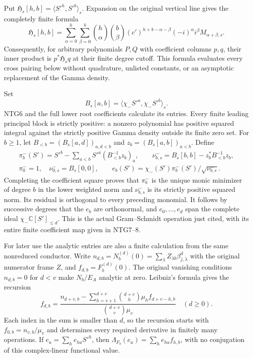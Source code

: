 Put $\mathfrak H_s[h,b]=\langle S'^h,S'^b\rangle_s$. Expansion
on the original vertical line gives the completely finite formula
\[
 \mathfrak H_s[h,b]
 =\sum_{\alpha=0}^{h}\sum_{\beta=0}^{b}
 \binom h\alpha\binom b\beta
 (c')^{h+b-\alpha-\beta}(-i)^\alpha i^\beta
 M_{\alpha+\beta,s}.
                                                               \tag{NTG6}
\]
Consequently, for arbitrary polynomials $P,Q$ with coefficient
columns $p,q$, their inner product is $p^*\mathfrak H_s q$
at their finite degree cutoff. This formula evaluates every
cross pairing below without quadrature, unlisted constants, or
an asymptotic replacement of the Gamma density.

Set
\[
 B_s[a,b]=\langle\chi_-S'^a,\chi_-S'^b\rangle_s.
                                                               \tag{NTG7}
\]
NTG6 and the full lower root coefficients calculate its entries.
Every finite leading principal block is strictly positive:
a nonzero polynomial has positive squared integral against the
strictly positive Gamma density outside its finite zero set.
For $b\ge1$, let $B_{<b}=(B_s[a,d])_{a,d<b}$ and
$z_b=(B_s[a,b])_{a<b}$. Define
\[
\begin{gathered}
 \pi_b^-(S')=S'^b-\sum_{a<b}S'^a(B_{<b}^{-1}z_b)_a,\qquad
 \nu_{b,s}^-=B_s[b,b]-z_b^*B_{<b}^{-1}z_b,\\
 \pi_0^-=1,\quad\nu_{0,s}^-=B_s[0,0],\qquad
 e_b(S')=\chi_-(S')\pi_b^-(S')/\sqrt{\nu_{b,s}^-}.
\end{gathered}                                                    \tag{NTG8}
\]
Completing the coefficient square proves that $\pi_b^-$ is
the unique monic minimizer of degree $b$ in the lower weighted
norm and $\nu_{b,s}^-$ is its strictly positive squared norm.
Its residual is orthogonal to every preceding monomial. It
follows by successive degrees that the $e_b$ are orthonormal,
and $e_0,\ldots,e_d$ span the complete ideal
$\chi_-\mathbb C[S']_{\le d}$. This is the actual Gram--Schmidt
operation just cited, with its entire finite coefficient map
given in NTG7--8.

For later use the analytic entries are also a finite calculation
from the same nonreduced conductor. Write
$n_{d,b}=N_b^{(d)}(0)=\sum_\lambda Z_{\lambda b}\beta_{j,\lambda}^d$
with the original numerator frame $Z$, and
$f_{d,b}=F_b^{(d)}(0)$. The original vanishing conditions
$n_{d,b}=0$ for $d<v$ make $N_b/E_A$ analytic at zero.
Leibniz's formula gives the recursion
\[
 f_{d,b}=
 \frac{n_{d+v,b}
       -\displaystyle\sum_{h=v+1}^{d+v}
              \binom{d+v}{h}\mu_h f_{d+v-h,b}}
      {\binom{d+v}{v}\mu_v}
       \quad(d\ge0).
                                                               \tag{NTG9}
\]
Each index in the sum is smaller than $d$, so the recursion
starts with $f_{0,b}=n_{v,b}/\mu_v$ and determines every required
derivative in finitely many operations. If $e_a=\sum_h e_{ha}S'^h$,
then $\Lambda_{F_b}(e_a)=\sum_h e_{ha}f_{h,b}$, with no
conjugation of this complex-linear functional value.

